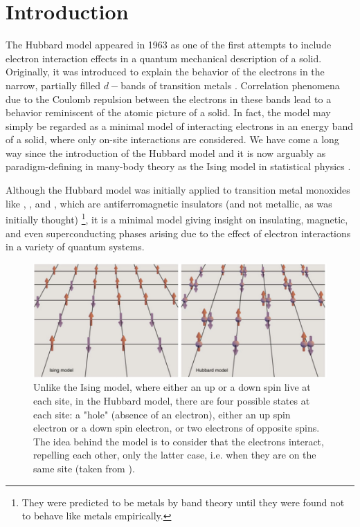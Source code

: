\section{Introduction}\label{sec:intro}

The Hubbard model appeared in 1963 as one of the first attempts to include electron interaction effects in a quantum mechanical description of a solid. Originally, it was introduced to explain the behavior of the electrons in the narrow, partially filled $d-$bands of transition metals \cite{Hubbard1963}. Correlation phenomena due to the Coulomb repulsion between the electrons in these bands lead to a behavior reminiscent of the atomic picture of a solid. In fact, the model may simply be regarded as a minimal model of interacting electrons in an energy band of a solid, where only on-site interactions are considered. We have come a long way since the introduction of the Hubbard model and it is now arguably as paradigm-defining in many-body theory as the Ising model in statistical physics \cite{Fazekas1999, Mahan2000, Altland2006}.

Although the Hubbard model was initially applied to transition metal monoxides like , , and , which are antiferromagnetic insulators (and not metallic, as was initially thought) \footnote{They were predicted to be metals by band theory until they were found not to behave like metals empirically.}, it is a minimal model giving insight on insulating, magnetic, and even superconducting phases arising due to the effect of electron interactions in a variety of quantum systems.

\begin{figure}[H]
	\centering
\includegraphics[width=0.9\linewidth]{Figures/HubbardModel/IsingVsHubbard.jpeg}
	\caption[Graphical comparison between the Ising and the Hubbard model.]{Unlike the Ising model, where either an up or a down spin live at each site, in the Hubbard model, there are four possible states at each site: a "hole" (absence of an electron), either an up spin electron or a down spin electron, or two electrons of opposite spins. The idea behind the model is to consider that the electrons interact, repelling each other, only the latter case, i.e. when they are on the same site (taken from \cite{Hayes2009}).}
	\label{fig:IsingVsHubbard}
\end{figure}

